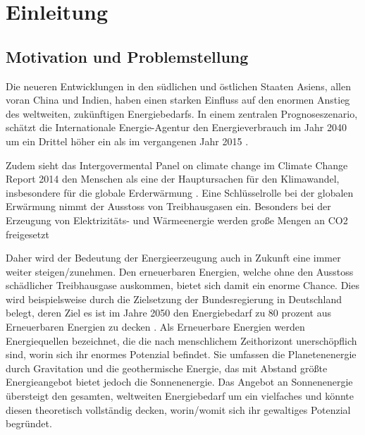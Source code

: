 \renewcommand{\chapterheadstartvskip}{\vspace*{2cm}}

\chapter{Einleitung}
\label{chap:einleitung}
\setcounter{page}{1}
\renewcommand{\chapterheadstartvskip}{\vspace*{-1cm}}


\section{Motivation und Problemstellung}
\label{sec:motivation}

Die neueren Entwicklungen in den südlichen und östlichen Staaten Asiens, allen voran China und Indien, haben einen starken Einfluss auf den enormen Anstieg des weltweiten, zukünftigen Energiebedarfs. In einem zentralen Prognoseszenario, schätzt die Internationale Energie-Agentur den Energieverbrauch im Jahr 2040 um ein Drittel höher ein als im vergangenen Jahr 2015 \cite[S.~1]{in15}.

Zudem sieht das Intergovermental Panel on climate change im Climate Change Report 2014 den Menschen als eine der Hauptursachen für den Klimawandel, insbesondere für die globale Erderwärmung \cite[S.~V]{ip14} . Eine Schlüsselrolle bei der globalen Erwärmung nimmt der Ausstoss von Treibhausgasen ein. Besonders bei der Erzeugung von Elektrizitäts- und Wärmeenergie werden große Mengen an CO2 freigesetzt \cite[S.~47]{ip14}

Daher wird der Bedeutung der Energieerzeugung auch in Zukunft eine immer weiter steigen/zunehmen. Den erneuerbaren Energien, welche ohne den Ausstoss schädlicher Treibhausgase auskommen, bietet sich damit ein enorme Chance. Dies wird beispielsweise durch die Zielsetzung der Bundesregierung in Deutschland belegt, deren Ziel es ist im Jahre 2050 den Energiebedarf zu 80 prozent aus Erneuerbaren Energien zu decken \cite[S.~2]{bi15}.
Als Erneuerbare Energien werden Energiequellen bezeichnet, die die nach menschlichem Zeithorizont unerschöpflich sind, worin sich ihr enormes Potenzial befindet. Sie umfassen die Planetenenergie durch Gravitation und die geothermische Energie, das mit Abstand größte Energieangebot bietet jedoch die Sonnenenergie.
Das Angebot an Sonnenenergie übersteigt den gesamten, weltweiten Energiebedarf um ein vielfaches und könnte diesen theoretisch vollständig decken, worin/womit sich ihr gewaltiges Potenzial begründet.

